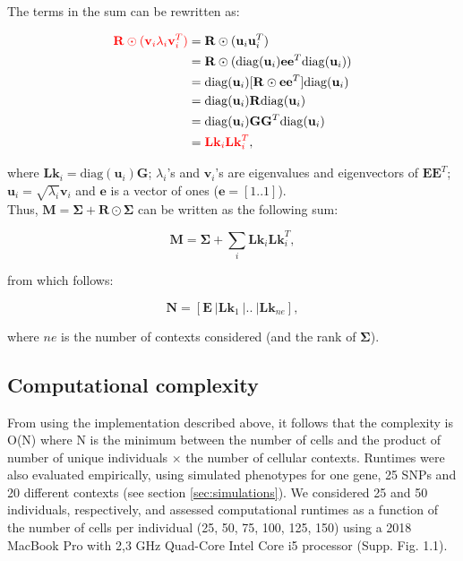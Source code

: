 
The terms in the sum can be rewritten as:

\begin{equation}\label{eq:Lk}
    \begin{split}
        \textcolor{red}{\mathbf{R} \odot (\mathbf{v}_i \lambda_i \mathbf{v}_i^T)} 
        & = \mathbf{R} \odot (\mathbf{u}_i \mathbf{u}_i^T) \\
        & = \mathbf{R} \odot (\mathrm{diag}(\mathbf{u}_i) \mathbf{e} \mathbf{e}^T \mathrm{diag}(\mathbf{u}_i)) \\
        & = \mathrm{diag}(\mathbf{u}_i)[\mathbf{R} \odot \mathbf{e} \mathbf{e}^T] \mathrm{diag}(\mathbf{u}_i) \\
        & = \mathrm{diag}(\mathbf{u}_i) \mathbf{R} \mathrm{diag}(\mathbf{u}_i) \\
        & = \mathrm{diag}(\mathbf{u}_i) \mathbf{G} \mathbf{G}^T  \mathrm{diag}(\mathbf{u}_i)  \\
        & = \textcolor{red}{\mathbf{Lk}_i \mathbf{Lk}_i^T},
    \end{split}
\end{equation}

where $\mathbf{Lk}_i = \mathrm{diag}(\mathbf{u}_i) \mathbf{G}$; $\lambda_i$'s and $\mathbf{v}_i$'s are eigenvalues and eigenvectors of $\mathbf{E}\mathbf{E}^T$; $\mathbf{u}_i = \sqrt{\lambda_i}\mathbf{v}_i$ and $\mathbf{e}$ is a vector of ones ($\mathbf{e} = [1..1]$). \\


Thus, $\mathbf{M} = \boldsymbol{\Sigma} + \mathbf{R} \odot \boldsymbol{\Sigma}$ can be written as the following sum:

\begin{equation}
    \mathbf{M} = \boldsymbol{\Sigma} + \sum_i \mathbf{Lk}_i \mathbf{Lk}_i^T,  
\end{equation}

from which follows:

\begin{equation}
    \mathbf{N} = [\mathbf{E} \ | \mathbf{Lk}_1 \ | .. \ | \mathbf{Lk}_{ne}],
\end{equation}

where $ne$ is the number of contexts considered (and the rank of $\boldsymbol{\Sigma}$).

\newpage

\subsection{Computational complexity}
From using the implementation described above, it follows that the complexity is O(N) where N is the minimum between the number of cells and the product of number of unique individuals $\times$ the number of cellular contexts. Runtimes were also evaluated empirically, using simulated phenotypes for one gene, 25 SNPs and 20 different contexts (see section \ref{sec:simulations}). We considered 25 and 50 individuals, respectively, and assessed computational runtimes as a function of the number of cells per individual (25, 50, 75, 100, 125, 150) using a 2018 MacBook Pro with 2,3 GHz Quad-Core Intel Core i5 processor (Supp. Fig. 1.1).


